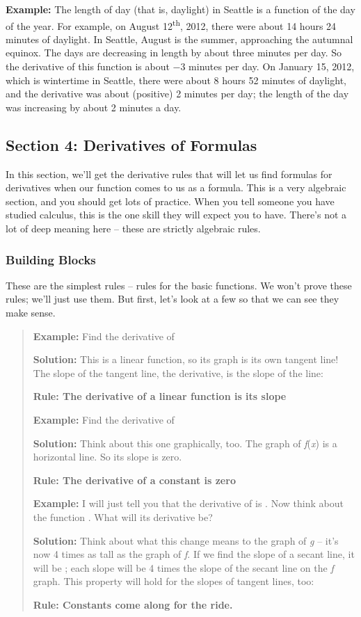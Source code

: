\textbf{Example:} The length of day (that is, daylight) in Seattle is a
function of the day of the year. For example, on August
12\textsuperscript{th}, 2012, there were about 14 hours 24 minutes of
daylight. In Seattle, August is the summer, approaching the autumnal
equinox. The days are decreasing in length by about three minutes per
day. So the derivative of this function is about −3 minutes per day. On
January 15, 2012, which is wintertime in Seattle, there were about 8
hours 52 minutes of daylight, and the derivative was about (positive) 2
minutes per day; the length of the day was increasing by about 2 minutes
a day.

\hypertarget{section-4-derivatives-of-formulas}{\subsection{Section 4:
Derivatives of Formulas}\label{section-4-derivatives-of-formulas}}

In this section, we'll get the derivative rules that will let us find
formulas for derivatives when our function comes to us as a formula.
This is a very algebraic section, and you should get lots of practice.
When you tell someone you have studied calculus, this is the one skill
they will expect you to have. There's not a lot of deep meaning here --
these are strictly algebraic rules.

\subsubsection{Building Blocks}\label{building-blocks}

These are the simplest rules -- rules for the basic functions. We won't
prove these rules; we'll just use them. But first, let's look at a few
so that we can see they make sense.

\begin{quote}
\textbf{Example:} Find the derivative of

\textbf{Solution:} This is a linear function, so its graph is its own
tangent line! The slope of the tangent line, the derivative, is the
slope of the line:

\textbf{Rule: The derivative of a linear function is its slope}

\textbf{Example:} Find the derivative of

\textbf{Solution:} Think about this one graphically, too. The graph of
\emph{f}(\emph{x}) is a horizontal line. So its slope is zero.

\textbf{Rule: The derivative of a constant is zero}

\textbf{Example:} I will just tell you that the derivative of is . Now
think about the function . What will its derivative be?

\textbf{Solution:} Think about what this change means to the graph of
\emph{g} -- it's now 4 times as tall as the graph of \emph{f}. If we
find the slope of a secant line, it will be ; each slope will be 4 times
the slope of the secant line on the \emph{f} graph. This property will
hold for the slopes of tangent lines, too:

\textbf{Rule: Constants come along for the ride.}
\end{quote}

